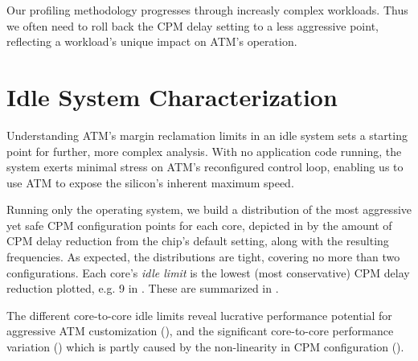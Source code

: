 Our profiling methodology progresses through increasly complex workloads. Thus we often need to roll back the CPM delay setting to a less aggressive point, reflecting a workload's unique impact on ATM's operation.

\section{Idle System Characterization}
\label{sec:process:idle}

Understanding ATM's margin reclamation limits in an idle system sets a starting point for further, more complex analysis. With no application code running, the system exerts minimal stress on ATM's reconfigured control loop, enabling us to use ATM to expose the silicon's inherent maximum speed.


Running only the operating system, we build a distribution of the most aggressive yet safe CPM configuration points for each core, depicted in  by the amount of CPM delay reduction from the chip's default setting, along with the resulting frequencies. As expected, the distributions are tight, covering no more than two configurations. Each core's \textit{idle limit} is the lowest (most conservative) CPM delay reduction plotted, e.g. 9 in . These are summarized in . 



The different core-to-core idle limits reveal lucrative performance potential for aggressive ATM customization (), and the significant core-to-core performance variation () which is partly caused by the non-linearity in CPM configuration ().

